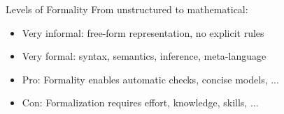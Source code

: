 \begin{Slide}{Levels of Formality}
From unstructured to mathematical:
\begin{itemize}
\item Very informal: free-form representation, no explicit rules
\item Very formal: syntax, semantics, inference, meta-language
\item Pro: Formality enables automatic checks, concise models, ...
\item Con: Formalization requires effort, knowledge, skills, ...




\end{itemize}
\end{Slide}